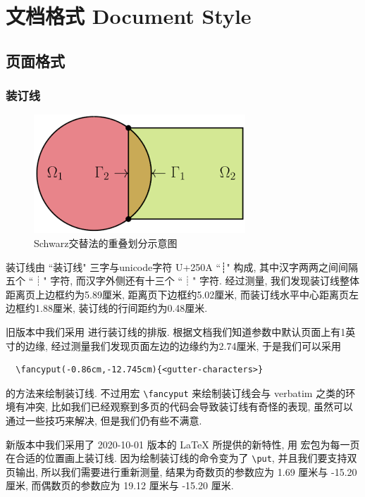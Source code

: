 
\section{文档格式 Document Style}

\subsection{页面格式}

\subsubsection{装订线}
\begin{figure}
	\begin{center}
	\includegraphics[]{data/fig/Schwarz_Alternating.png}
	\caption{Schwarz交替法的重叠划分示意图}
	\end{center}
\end{figure}
装订线由 ``装订线" 三字与unicode字符 U+250A ``┊" 构成, 其中汉字两两之间间隔五个 ``┊" 字符, 而汉字外侧还有十三个 ``┊" 字符. 经过测量, 我们发现装订线整体距离页上边框约为5.89厘米, 距离页下边框约5.02厘米, 而装订线水平中心距离页左边框约1.88厘米, 装订线的行间距约为0.48厘米.

旧版本中我们采用  进行装订线的排版. 根据文档我们知道参数中默认页面上有1英寸的边缘, 经过测量我们发现页面左边的边缘约为2.74厘米, 于是我们可以采用
\begin{verbatim}
  \fancyput(-0.86cm,-12.745cm){<gutter-characters>}
\end{verbatim}
的方法来绘制装订线. 不过用宏 \verb|\fancyput| 来绘制装订线会与 verbatim 之类的环境有冲突, 比如我们已经观察到多页的代码会导致装订线有奇怪的表现, 虽然可以通过一些技巧来解决, 但是我们仍有些不满意.

新版本中我们采用了 2020-10-01 版本的 {\LaTeX} 所提供的新特性, 用  宏包为每一页在合适的位置画上装订线. 因为绘制装订线的命令变为了 \verb|\put|, 并且我们要支持双页输出, 所以我们需要进行重新测量, 结果为奇数页的参数应为 1.69 厘米与 -15.20 厘米, 而偶数页的参数应为 19.12 厘米与 -15.20 厘米.


